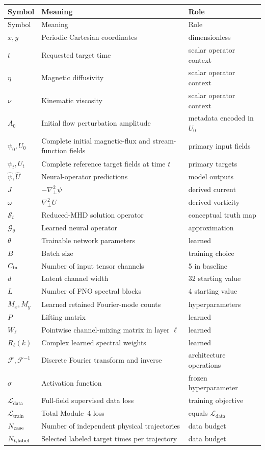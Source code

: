 \documentclass[11pt]{article}
\newcommand{\Lap}{\nabla_\perp^2}
\newcommand{\Ldata}{\mathcal{L}_{\mathrm{data}}}
\newcommand{\Ltrain}{\mathcal{L}_{\mathrm{train}}}
\newcommand{\FFT}{\mathcal{F}}
\newcommand{\IFFT}{\mathcal{F}^{-1}}
\begin{document}
\begin{longtable}{p{}p{}p{}}
\toprule
Symbol & Meaning & Role \\
\midrule
\endfirsthead
\toprule
Symbol & Meaning & Role \\
\midrule
\endhead
$x,y$ & Periodic Cartesian coordinates & dimensionless \\
$t$ & Requested target time & scalar operator context \\
$\eta$ & Magnetic diffusivity & scalar operator context \\
$\nu$ & Kinematic viscosity & scalar operator context \\
$A_0$ & Initial flow perturbation amplitude & metadata encoded in $U_0$ \\
$\psi_0,U_0$ & Complete initial magnetic-flux and stream-function fields & primary input fields \\
$\psi_t,U_t$ & Complete reference target fields at time $t$ & primary targets \\
$\widehat\psi,\widehat U$ & Neural-operator predictions & model outputs \\
$J$ & $-\Lap\psi$ & derived current \\
$\omega$ & $\Lap U$ & derived vorticity \\
$\mathcal{S}_t$ & Reduced-MHD solution operator & conceptual truth map \\
$\mathcal{G}_\theta$ & Learned neural operator & approximation \\
$\theta$ & Trainable network parameters & learned \\
$B$ & Batch size & training choice \\
$C_{\rm in}$ & Number of input tensor channels & 5 in baseline \\
$d$ & Latent channel width & 32 starting value \\
$L$ & Number of FNO spectral blocks & 4 starting value \\
$M_x,M_y$ & Learned retained Fourier-mode counts & hyperparameters \\
$P$ & Lifting matrix & learned \\
$W_\ell$ & Pointwise channel-mixing matrix in layer $\ell$ & learned \\
$R_\ell(k)$ & Complex learned spectral weights & learned \\
$\FFT,\IFFT$ & Discrete Fourier transform and inverse & architecture operations \\
$\sigma$ & Activation function & frozen hyperparameter \\
$\Ldata$ & Full-field supervised data loss & training objective \\
$\Ltrain$ & Total Module~4 loss & equals $\Ldata$ \\
$N_{\rm case}$ & Number of independent physical trajectories & data budget \\
$N_{t,\rm label}$ & Selected labeled target times per trajectory & data budget \\
\bottomrule
\end{longtable}
\end{document}
